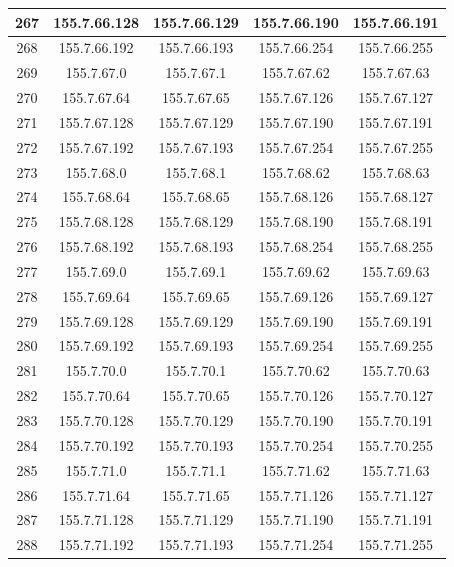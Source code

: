 \documentclass[letterpaper,12pt]{article}
\begin{document}
\begin{longtable}{|c|c|c|c|c|}
        267 & 155.7.66.128 & 155.7.66.129 & 155.7.66.190 & 155.7.66.191 \\ \hline
        268 & 155.7.66.192 & 155.7.66.193 & 155.7.66.254 & 155.7.66.255 \\ \hline
        269 & 155.7.67.0 & 155.7.67.1 & 155.7.67.62 & 155.7.67.63 \\ \hline
        270 & 155.7.67.64 & 155.7.67.65 & 155.7.67.126 & 155.7.67.127 \\ \hline
        271 & 155.7.67.128 & 155.7.67.129 & 155.7.67.190 & 155.7.67.191 \\ \hline
        272 & 155.7.67.192 & 155.7.67.193 & 155.7.67.254 & 155.7.67.255 \\ \hline
        273 & 155.7.68.0 & 155.7.68.1 & 155.7.68.62 & 155.7.68.63 \\ \hline
        274 & 155.7.68.64 & 155.7.68.65 & 155.7.68.126 & 155.7.68.127 \\ \hline
        275 & 155.7.68.128 & 155.7.68.129 & 155.7.68.190 & 155.7.68.191 \\ \hline
        276 & 155.7.68.192 & 155.7.68.193 & 155.7.68.254 & 155.7.68.255 \\ \hline
        277 & 155.7.69.0 & 155.7.69.1 & 155.7.69.62 & 155.7.69.63 \\ \hline
        278 & 155.7.69.64 & 155.7.69.65 & 155.7.69.126 & 155.7.69.127 \\ \hline
        279 & 155.7.69.128 & 155.7.69.129 & 155.7.69.190 & 155.7.69.191 \\ \hline
        280 & 155.7.69.192 & 155.7.69.193 & 155.7.69.254 & 155.7.69.255 \\ \hline
        281 & 155.7.70.0 & 155.7.70.1 & 155.7.70.62 & 155.7.70.63 \\ \hline
        282 & 155.7.70.64 & 155.7.70.65 & 155.7.70.126 & 155.7.70.127 \\ \hline
        283 & 155.7.70.128 & 155.7.70.129 & 155.7.70.190 & 155.7.70.191 \\ \hline
        284 & 155.7.70.192 & 155.7.70.193 & 155.7.70.254 & 155.7.70.255 \\ \hline
        285 & 155.7.71.0 & 155.7.71.1 & 155.7.71.62 & 155.7.71.63 \\ \hline
        286 & 155.7.71.64 & 155.7.71.65 & 155.7.71.126 & 155.7.71.127 \\ \hline
        287 & 155.7.71.128 & 155.7.71.129 & 155.7.71.190 & 155.7.71.191 \\ \hline
        288 & 155.7.71.192 & 155.7.71.193 & 155.7.71.254 & 155.7.71.255 \\ \hline

\end{longtable}
\end{document}
